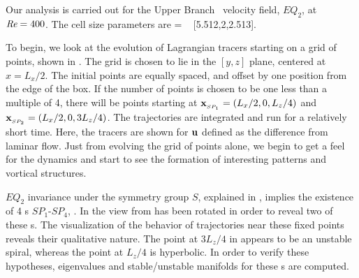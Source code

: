 \documentclass[letter,12pt,openany]{article}
\begin{document}
Our analysis is carried out for the 
Upper Branch \eqv\ velocity field, $EQ_2$, at $\textit{Re} = 400$.
The cell size parameters are \beq   [L_x,2,L_z]
         = \; [2\pi/1.14,2,4\pi/5]
         ~ [5.512,2,2.513].
\label{cellW03}
\eeq

To begin, we look at the evolution of Lagrangian tracers starting on a grid of points, shown in . The grid
is chosen to lie in the $[y,z]$ plane, centered at $x = L_x/2$. The initial
points are equally spaced, and offset by one position from the edge
of the box. If the number of points is chosen to be one less than a
multiple of 4, there will be points starting at $\bold{x}_{_{SP_{1}}}=(L_x/2,0,L_z/4)$ and
$\bold{x}_{_{SP_{2}}}=(L_x/2,0,3L_z/4)$. The
trajectories are integrated and run for a relatively short time. Here, the tracers are shown for ${\bf u}$ defined as the difference from laminar flow. Just from evolving the grid of points alone, we begin to get a feel for the dynamics and start to see the formation of interesting patterns and vortical structures.




$EQ_2$ invariance under the symmetry group $S$, explained  in
, implies the existence of 4 \stagp s $SP_1$-$SP_4$,
.
In  the view
from  has been rotated in order
to reveal two of these \stagp s. The visualization of the behavior of trajectories near these
fixed points reveals their  qualitative nature.
The point at $3L_z/4$ in  appears to be an
unstable spiral, whereas the point at $L_z/4$ is hyperbolic. In order to verify these hypotheses, eigenvalues and
stable/unstable manifolds for these \stagp s are computed. \\
\end{document}
